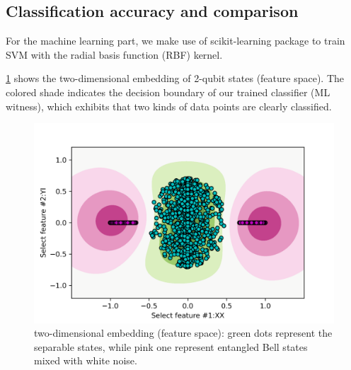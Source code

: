 \documentclass[
aps,
pra,
twocolumn,
floatfix,
]{revtex4-2}
\theoremstyle{plain}
\theoremstyle{definition}
\begin{document}
\subsection{Classification accuracy and comparison}

For the machine learning part, we make use of scikit-learning package \cite{pedregosaScikitlearnMachineLearning2011} to train SVM with the radial basis function (RBF) kernel.


\cref{fig:feature_space} shows the two-dimensional embedding of  2-qubit states (feature space).
The colored shade indicates the decision boundary of our trained classifier (ML witness),
which exhibits that two kinds of data points are clearly classified.
\begin{figure}[!ht]
	\centering
	\includegraphics[width=.9\linewidth]{./Code/feature_space_2d.png}
	\caption{two-dimensional embedding (feature space): green dots represent the separable states, while pink one represent entangled Bell states mixed with white noise.}
	\label{fig:feature_space}
\end{figure}
\end{document}
